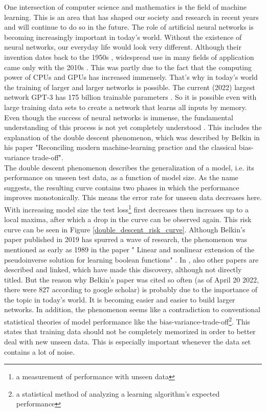 One intersection of computer science and mathematics is the field of machine learning. This is an area that has shaped our society and research in recent years and will continue to do so in the future. The role of artificial neural networks is becoming increasingly important in today's world. Without the existence of neural networks, our everyday life would look very different. Although their invention dates back to the 1950s \cite{wikipedia_Machine_learning}, widespread use in many fields of application came only with the 2010s \cite{wikipedia_Machine_learning}. This was partly due to the fact that the computing power of CPUs and GPUs has increased immensely. That's why in today's world the training of larger and larger networks is possible. The current (2022) largest network GPT-3 has 175 billion trainable parameters \cite{romero_2021_tw_ds}. So it is possible even with large training data sets to create a network that learns all inputs by memory. Even though the success of neural networks is immense, the fundamental understanding of this process is not yet completely understood \cite{belkin}. This includes the explanation of the double descent phenomenon, which was described by Belkin in his paper "Reconciling modern machine-learning practice and
the classical bias-variance trade-off". \\
The double descent phenomenon describes the generalization of a model, i.e. its performance on unseen test data, as a function of model size. As the name suggests, the resulting curve contains two phases in which the performance improves monotonically. This means the error rate for unseen data decreases here. With increasing model size the test loss\footnote{a measurement of performance with unseen data} first decreases then increases up to a local maxima, after which a drop in the curve can be observed again. This risk curve can be seen in Figure \ref{double_descent_risk_curve}. Although Belkin's paper published in 2019 has spurred a wave of research, the phenomenon was mentioned as early as 1989 in the paper " Linear and nonlinear extension of the pseudoinverse solution for learning boolean functions" \cite{Vallet_1989}.
In \cite{prehistory_double_descent}, also other papers are described and linked, which have made this discovery, although not directly titled. But the reason why Belkin's paper was cited so often (as of April 20 2022, there were 827 according to google scholar) is probably due to the importance of the topic in today's world. It is becoming easier and easier to build larger networks. In addition, the phenomenon seems like a contradiction to conventional statistical theories of model performance like the bias-variance-trade-off\footnote{a statistical method of analyzing a learning algorithm's expected performance}. This states that training data should not be completely memorized in order to better deal with new unseen data. This is especially important whenever the data set contains a lot of noise. 

